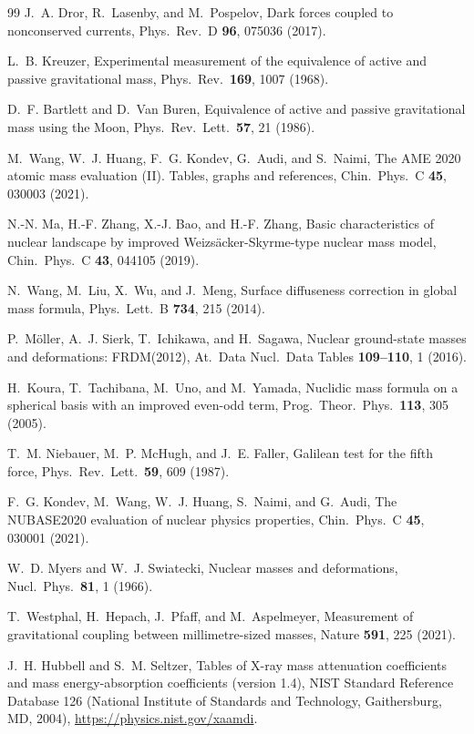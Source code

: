\documentclass[aps,prd,onecolumn,superscriptaddress,floatfix,nofootinbib]{revtex4-2}
\begin{document}
\begin{thebibliography}{99}
J.~A. Dror, R.~Lasenby, and M.~Pospelov,
Dark forces coupled to nonconserved currents,
Phys.\ Rev.\ D \textbf{96}, 075036 (2017).

L.~B. Kreuzer,
Experimental measurement of the equivalence of active and passive gravitational mass,
Phys.\ Rev.\ \textbf{169}, 1007 (1968).

D.~F. Bartlett and D.~Van Buren,
Equivalence of active and passive gravitational mass using the Moon,
Phys.\ Rev.\ Lett.\ \textbf{57}, 21 (1986).

M.~Wang, W.~J. Huang, F.~G. Kondev, G.~Audi, and S.~Naimi,
The AME 2020 atomic mass evaluation (II). Tables, graphs and references,
Chin.\ Phys.\ C \textbf{45}, 030003 (2021).

N.-N. Ma, H.-F. Zhang, X.-J. Bao, and H.-F. Zhang,
Basic characteristics of nuclear landscape by improved Weizs\"acker-Skyrme-type nuclear mass model,
Chin.\ Phys.\ C \textbf{43}, 044105 (2019).

N.~Wang, M.~Liu, X.~Wu, and J.~Meng,
Surface diffuseness correction in global mass formula,
Phys.\ Lett.\ B \textbf{734}, 215 (2014).

P.~M\"oller, A.~J. Sierk, T.~Ichikawa, and H.~Sagawa,
Nuclear ground-state masses and deformations: FRDM(2012),
At.\ Data Nucl.\ Data Tables \textbf{109--110}, 1 (2016).

H.~Koura, T.~Tachibana, M.~Uno, and M.~Yamada,
Nuclidic mass formula on a spherical basis with an improved even-odd term,
Prog.\ Theor.\ Phys.\ \textbf{113}, 305 (2005).

T.~M. Niebauer, M.~P. McHugh, and J.~E. Faller,
Galilean test for the fifth force,
Phys.\ Rev.\ Lett.\ \textbf{59}, 609 (1987).

F.~G. Kondev, M.~Wang, W.~J. Huang, S.~Naimi, and G.~Audi,
The NUBASE2020 evaluation of nuclear physics properties,
Chin.\ Phys.\ C \textbf{45}, 030001 (2021).

W.~D. Myers and W.~J. Swiatecki,
Nuclear masses and deformations,
Nucl.\ Phys.\ \textbf{81}, 1 (1966).

T.~Westphal, H.~Hepach, J.~Pfaff, and M.~Aspelmeyer,
Measurement of gravitational coupling between millimetre-sized masses,
Nature \textbf{591}, 225 (2021).

J.~H. Hubbell and S.~M. Seltzer,
Tables of X-ray mass attenuation coefficients and mass energy-absorption coefficients (version 1.4),
NIST Standard Reference Database 126 (National Institute of Standards and Technology, Gaithersburg, MD, 2004),
\url{https://physics.nist.gov/xaamdi}.


\end{thebibliography}
\end{document}
